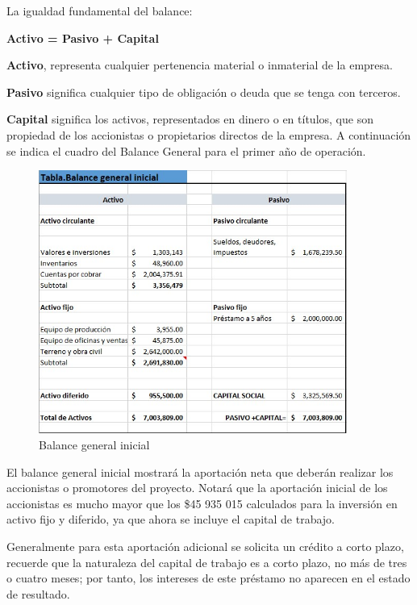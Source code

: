 La igualdad fundamental del balance:

	\textbf{	Activo = Pasivo + Capital }
  
\textbf{Activo}, representa cualquier pertenencia material o inmaterial de la empresa. 

\textbf{Pasivo} significa cualquier tipo de obligación o deuda que se tenga con terceros.

\textbf{Capital} significa los activos, representados en dinero o en títulos, que son propiedad de los accionistas o propietarios directos de la empresa.
A continuación se indica el cuadro del Balance General para el primer año de operación.

\begin{figure}[H]
    \centering	
    \includegraphics[width=0.9\textwidth]{chapters/ELC_12.png} 
    \caption{Balance general inicial}
\label{fig:croquis190125}
\end{figure}

El balance general inicial mostrará la aportación neta que deberán realizar los accionistas o promotores del proyecto. Notará que la aportación inicial de los accionistas es mucho mayor que los \$45 935 015 calculados para la inversión en activo fijo y diferido, ya que ahora se incluye el capital de trabajo. 

Generalmente para esta aportación adicional se solicita un crédito a corto plazo, recuerde que la naturaleza del capital de trabajo es a corto plazo, no más de tres o cuatro meses; por tanto, los intereses de este préstamo no aparecen en el estado de resultado.




